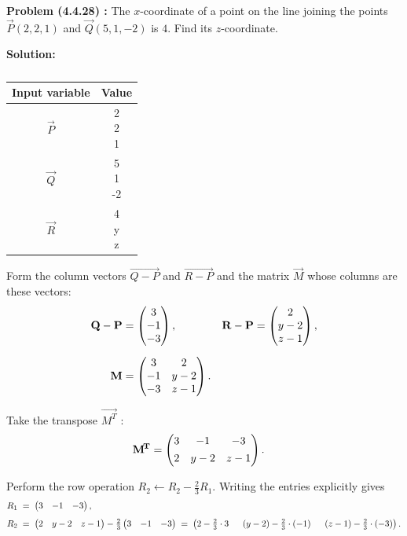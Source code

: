 \documentclass[12pt]{article}
\begin{document}
\textbf{Problem (4.4.28) :} The $x$-coordinate of a point on the line joining the points 
$\vec{P}(2,2,1)$ and $\vec{Q}(5,1,-2)$ is $4$. Find its $z$-coordinate.

\textbf{Solution:}

\begin{table}[H]
\centering
\begin{tabular}[12pt]{ |c| c|}
    \hline
    \textbf{Input variable} & \textbf{Value}\\ 
    \hline
    $\vec{P}$ & \myvec{2 \\2 \\1} \\
    \hline 
    $\vec{Q}$ & \myvec{5 \\1 \\-2}\\
    \hline
    $\vec{R}$ & \myvec{4 \\y \\z}\\
    \hline
    \end{tabular}
    \caption{}
    \label{}
 \end{table}

Form the column vectors $\vec{Q-P}$ and $\vec{R-P}$ and the matrix $\vec{M}$ whose columns are these vectors:
\begin{align}
\mathbf{Q-P} &= \begin{pmatrix}3\\-1\\-3\end{pmatrix}, & \mathbf{R-P} &= \begin{pmatrix}2\\y-2\\z-1\end{pmatrix},\\[6pt]
\mathbf{M} &= \begin{pmatrix}3 & 2 \\ -1 & y-2 \\ -3 & z-1\end{pmatrix}.
\end{align}

Take the transpose $\vec{M^{\!T}}$ :
\begin{align}
\mathbf{M^{\!T}} &= \begin{pmatrix}3 & -1 & -3 \\[4pt] 2 & y-2 & z-1 \end{pmatrix}.
\end{align}

Perform the row operation \(R_2 \leftarrow R_2 - \tfrac{2}{3}R_1\).  Writing the entries explicitly gives
\begin{align}
R_1 &\;=\; \begin{pmatrix}3 & -1 & -3\end{pmatrix}, \\[4pt]
R_2 &\;=\; \begin{pmatrix}2 & y-2 & z-1\end{pmatrix} - \tfrac{2}{3}\begin{pmatrix}3 & -1 & -3\end{pmatrix} 
     \;=\; \begin{pmatrix}2 - \tfrac{2}{3}\cdot 3 \; &\; (y-2) - \tfrac{2}{3}\cdot(-1) \; &\; (z-1) - \tfrac{2}{3}\cdot(-3)\end{pmatrix}.
\end{align}
\end{document}
